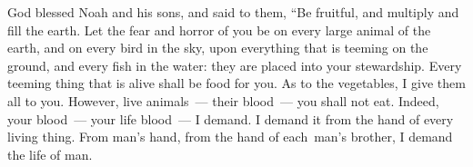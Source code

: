 
\begin{inparaenum}
     God blessed Noah and his sons, and said to them, ``Be fruitful, and multiply and fill the earth.%
     Let the fear and horror of you be on every large animal of the earth, and on every bird in the sky, upon everything that is teeming on the ground, and every fish in the water: they are placed into your stewardship.%
     Every teeming thing that is alive shall be food for you. As to the vegetables, I give them all to you.%
     However, live animals~--- their blood~--- you shall not eat.%
     Indeed, your blood~--- your life blood\understood~--- I demand. I demand it from the hand of every living thing. From man's hand, from the hand of each\understood\ man's brother, I demand the life of man.%
    
    
    
    
    
    
\end{inparaenum}
